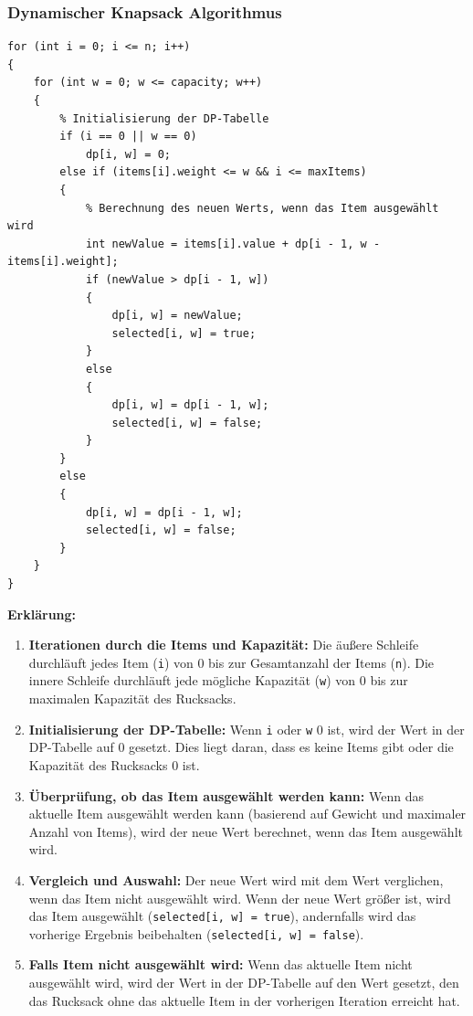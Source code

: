 \subsubsection{Dynamischer Knapsack Algorithmus}
\begin{lstlisting}[style=csharp, caption={}, label=code:dynamic]
for (int i = 0; i <= n; i++)
{
    for (int w = 0; w <= capacity; w++)
    {
        % Initialisierung der DP-Tabelle
        if (i == 0 || w == 0)
            dp[i, w] = 0;
        else if (items[i].weight <= w && i <= maxItems)
        {
            % Berechnung des neuen Werts, wenn das Item ausgewählt wird
            int newValue = items[i].value + dp[i - 1, w - items[i].weight];
            if (newValue > dp[i - 1, w])
            {
                dp[i, w] = newValue;
                selected[i, w] = true;
            }
            else
            {
                dp[i, w] = dp[i - 1, w];
                selected[i, w] = false;
            }
        }
        else
        {
            dp[i, w] = dp[i - 1, w];
            selected[i, w] = false;
        }
    }
}
\end{lstlisting}

\textbf{Erklärung:}
\begin{enumerate}
    \item \textbf{Iterationen durch die Items und Kapazität:} Die äußere Schleife durchläuft jedes Item
    (\texttt{i}) von 0 bis zur Gesamtanzahl der Items (\texttt{n}). Die innere Schleife durchläuft jede mögliche
    Kapazität (\texttt{w}) von 0 bis zur maximalen Kapazität des Rucksacks.

    \item \textbf{Initialisierung der DP-Tabelle:} Wenn \texttt{i} oder \texttt{w} 0 ist, wird der Wert in der
    DP-Tabelle auf 0 gesetzt. Dies liegt daran, dass es keine Items gibt oder die Kapazität des Rucksacks 0 ist.

    \item \textbf{Überprüfung, ob das Item ausgewählt werden kann:} Wenn das aktuelle Item ausgewählt werden
    kann (basierend auf Gewicht und maximaler Anzahl von Items), wird der neue Wert berechnet, wenn das Item
    ausgewählt wird.

    \item \textbf{Vergleich und Auswahl:} Der neue Wert wird mit dem Wert verglichen, wenn das Item nicht
    ausgewählt wird. Wenn der neue Wert größer ist, wird das Item ausgewählt (\texttt{selected[i, w] = true}),
    andernfalls wird das vorherige Ergebnis beibehalten (\texttt{selected[i, w] = false}).

    \item \textbf{Falls Item nicht ausgewählt wird:} Wenn das aktuelle Item nicht ausgewählt wird, wird der
    Wert in der DP-Tabelle auf den Wert gesetzt, den das Rucksack ohne das aktuelle Item in der vorherigen
    Iteration erreicht hat.\\
\end{enumerate}

